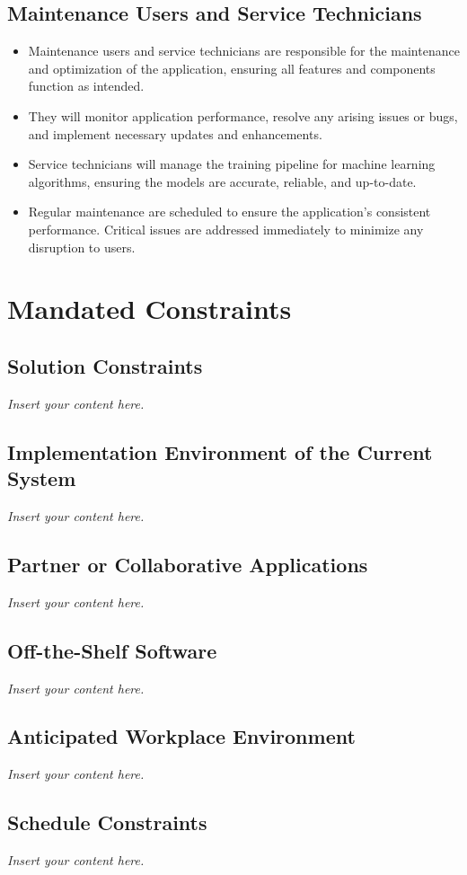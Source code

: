 \documentclass[12pt]{article}
\newcommand{\lips}{\textit{Insert your content here.}}
\begin{document}
\subsection{Maintenance Users and Service Technicians}
\begin{itemize}
    \item Maintenance users and service technicians are responsible for the maintenance and optimization of the application, ensuring all features and components function as intended.
    \item They will monitor application performance, resolve any arising issues or bugs, and implement necessary updates and enhancements.
    \item Service technicians will manage the training pipeline for machine learning algorithms, ensuring the models are accurate, reliable, and up-to-date.
    \item Regular maintenance are scheduled to ensure the application's consistent performance. Critical issues are addressed immediately to minimize any disruption to users.
\end{itemize}

\section{Mandated Constraints}
\subsection{Solution Constraints}
\lips
\subsection{Implementation Environment of the Current System}
\lips
\subsection{Partner or Collaborative Applications}
\lips
\subsection{Off-the-Shelf Software}
\lips
\subsection{Anticipated Workplace Environment}
\lips
\subsection{Schedule Constraints}
\lips
\end{document}
